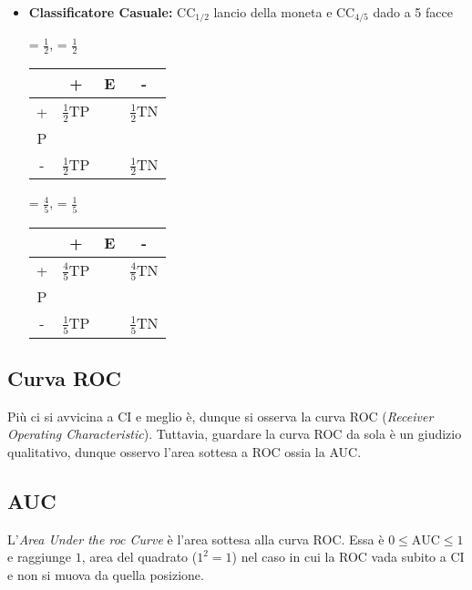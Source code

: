 \documentclass[11pt]{report}
\begin{document}
\begin{itemize}
	\item \textbf{Classificatore Casuale:} $\text{CC}_{1/2}$ lancio della moneta e $\text{CC}_{4/5}$ dado a 5 facce
    \begin{center}
        \begin{minipage}{0.5\textwidth}
            \begin{center}
                 = $\frac{1}{2}$,  = $\frac{1}{2}$
                \hfill
                \begin{tabular}{ c| c c c }
                & + & E & - \\
                \hline
                + & $\frac{1}{2}$TP & & $\frac{1}{2}$TN \\ 
                P \\
                - & $\frac{1}{2}$TP & & $\frac{1}{2}$TN
                \end{tabular}
            \end{center}
        \end{minipage}
    \end{center}
    \begin{center}
        \begin{minipage}{0.5\textwidth}
            \begin{center}
                 = $\frac{4}{5}$,  = $\frac{1}{5}$
                \hfill
                \begin{tabular}{ c| c c c }
                & + & E & - \\
                \hline
                + & $\frac{4}{5}$TP & & $\frac{4}{5}$TN \\ 
                P \\
                - & $\frac{1}{5}$TP & & $\frac{1}{5}$TN
                \end{tabular}
            \end{center}
        \end{minipage}
    \end{center}
\end{itemize}
\subsection{Curva ROC}
Più ci si avvicina a CI e meglio è, dunque si osserva la curva ROC (\textit{Receiver Operating Characteristic}). Tuttavia, guardare la curva ROC da sola è un giudizio qualitativo, dunque osservo l'area sottesa a ROC ossia la AUC.
\subsection{AUC}
L'\textit{Area Under the roc Curve} è l'area sottesa alla curva ROC. Essa è $0 \leq \text{AUC} \leq 1$ e raggiunge $1$, area del quadrato ($1^2 = 1$) nel caso in cui la ROC vada subito a CI e non si muova da quella posizione.
\begin{center}
    
\end{center}
\end{document}
